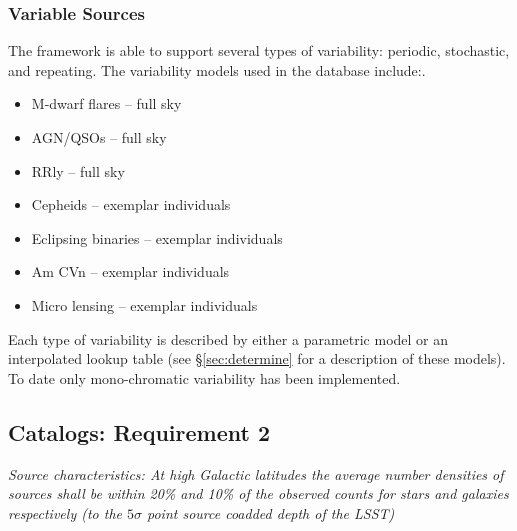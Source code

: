 \documentclass[]{article}
\begin{document}
\subsubsection{Variable Sources}
The framework is able to support several types of variability:
periodic, stochastic, and repeating.  The variability models used in
the database include:.
\begin{itemize}
\item M-dwarf flares -- full sky
\item AGN/QSOs -- full sky
\item RRly -- full sky
\item Cepheids -- exemplar individuals
\item Eclipsing binaries -- exemplar individuals
\item Am CVn -- exemplar individuals
\item Micro lensing -- exemplar individuals
\end{itemize}
Each type of variability is described by either a parametric model or
an interpolated lookup table (see \S\ref{sec:determine} for a
description of these models).  To date only mono-chromatic variability
has been implemented.

\subsection{Catalogs: Requirement 2}

{\it Source characteristics: At high Galactic latitudes the average
  number densities of sources shall be within 20\% and 10\% of the
  observed counts for stars and galaxies respectively (to the
  $5\sigma$ point source coadded depth of the LSST) } \\

\end{document}
